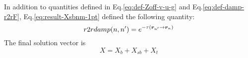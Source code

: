 \documentclass [10pt,letterpaper]{article}
\renewcommand{\vec}{\vectorsym}
\begin{document}
In addition to quantities defined in Eq.\eqref{eq:def-Zoff-v-u-g} and Eq.\eqref{eq:def-damp-r2rF}, Eq.\eqref{eq:result-Xsbnm-1pt} defined the following quantity:
\begin{equation}
	r2rdamp(n,n^\prime)
	=
	e^{-\tau(\vec{r}_{n^\prime} \to \vec{r}_n)} 
\end{equation}
The final solution vector is
\begin{equation} \label{eq:X-Xb-Xsb-Xt}
	X=X_b+X_{sb}+X_t
\end{equation}

\end{document}
